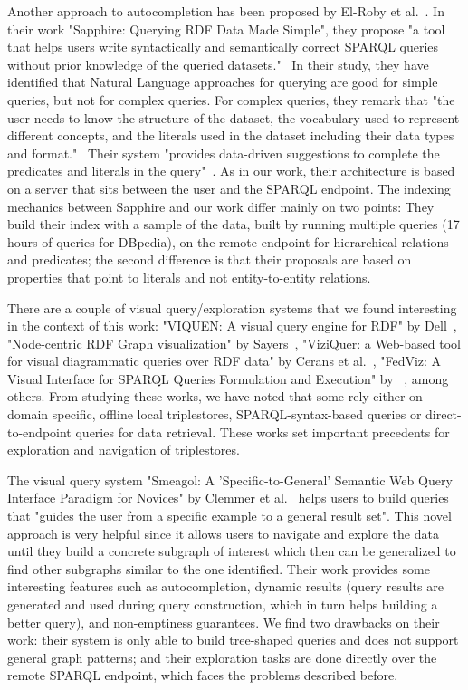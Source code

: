 Another approach to autocompletion has been proposed by El-Roby et al.~\cite{El-Roby2016}. 
In their work "Sapphire: Querying RDF Data Made Simple", they propose "a tool that helps users write syntactically and semantically correct SPARQL queries without prior knowledge of the queried datasets."~\cite{El-Roby2016}
In their study, they have identified that Natural Language approaches for querying are good for simple queries, but not for complex queries. 
For complex queries, they remark that "the user needs to know the structure of the dataset, the vocabulary used to represent different concepts, and the literals used in the dataset including their data types and format."~\cite{El-Roby2016}
Their system "provides data-driven suggestions to complete the predicates and literals in the query"~\cite{El-Roby2016}. 
As in our work, their architecture is based on a server that sits between the user and the SPARQL endpoint.
The indexing mechanics between Sapphire and our work differ mainly on two points: 
They build their index with a sample of the data, built by running multiple queries (17 hours of queries for DBpedia), on the remote endpoint for hierarchical relations and predicates; 
the second difference is that their proposals are based on properties that point to literals and not entity-to-entity relations.

There are a couple of visual query/exploration systems that we found interesting in the context of this work: "VIQUEN: A visual query engine for RDF" by Dell~\cite{Dell2010}, "Node-centric RDF Graph visualization" by Sayers~\cite{Sayers2004}, "ViziQuer: a Web-based tool for visual diagrammatic queries over RDF data" by Cerans et al.~\cite{Cerans2018}, "FedViz: A Visual Interface for SPARQL Queries Formulation and Execution" by ~\cite{Zainab2015}, among others. From studying these works, we have noted that some rely either on domain specific, offline local triplestores, SPARQL-syntax-based queries or direct-to-endpoint queries for data retrieval. These works set important precedents for exploration and navigation of triplestores.

The visual query system "Smeagol: A 'Specific-to-General' Semantic Web Query Interface Paradigm for Novices" by Clemmer et al.~\cite{Clemmer2011} helps users to build queries that "guides the user from a specific example to a general result set". This novel approach is very helpful since it allows users to navigate and explore the data until they build a concrete subgraph of interest which then can be generalized to find other subgraphs similar to the one identified. Their work provides some interesting features such as autocompletion, dynamic results (query results are generated and used during query construction, which in turn helps building a better query), and non-emptiness guarantees. We find two drawbacks on their work: their system is only able to build tree-shaped queries and does not support general graph patterns; and their exploration tasks are done directly over the remote SPARQL endpoint, which faces the problems described before.

